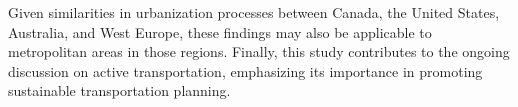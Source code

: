 \documentclass[preprint, 3p,
authoryear]{elsarticle} %
\begin{document}
Given similarities in urbanization processes between Canada, the United
States, Australia, and West Europe, these findings may also be
applicable to metropolitan areas in those regions. Finally, this study
contributes to the ongoing discussion on active transportation,
emphasizing its importance in promoting sustainable transportation
planning.

\renewcommand\refname{References}

\end{document}
